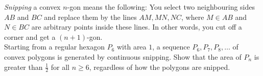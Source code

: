 \emph{Snipping} a convex $n$-gon means the following: You select two neighbouring sides $AB$ and
$BC$ and replace them by the lines $AM, MN, NC$, where $M \in AB$ and $N \in BC$ are arbitrary
points inside these lines. In other words, you cut off a corner and get a $(n\!+\!1)$-gon.\\
Starting from a regular hexagon $P_6$ with area $1$, a sequence
$P_6, P_7, P_8,\ldots$ of convex polygons is generated by continuous snipping.
Show that the area of $P_n$ is greater than $\frac{1}{2}$ for
all $n\geq 6$, regardless of how the polygons are snipped.
